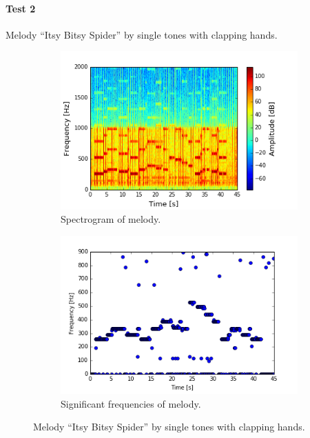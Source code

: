 \paragraph{Test 2} Melody ``Itsy Bitsy Spider'' by single tones with clapping hands.  
\begin{figure}[H]
\centering
\begin{subfigure}{0.49\textwidth}
\centering
\includegraphics[width=\textwidth]{figures/validation/systemtest/final_spec2.png}
\caption{Spectrogram of melody.}
\label{fig:final_spec2}
\end{subfigure}
\begin{subfigure}{0.49\textwidth}
\centering
\includegraphics[width=\textwidth]{figures/validation/systemtest/final_peak2.png}
\caption{Significant frequencies of melody.}
\label{fig:final_peak3}
\end{subfigure}
\caption{Melody ``Itsy Bitsy Spider'' by single tones with clapping hands.}
\label{fig:final_3}
\end{figure}  

